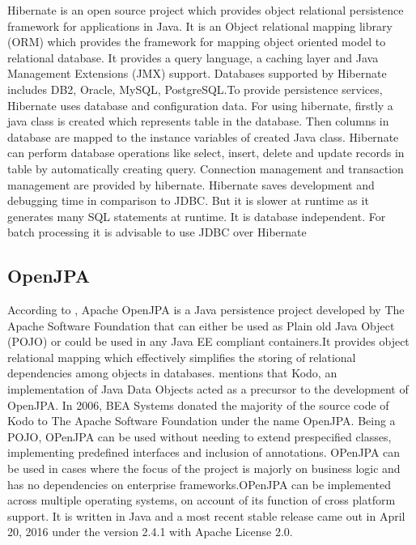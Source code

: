      Hibernate is an open source project which provides object
     relational persistence framework for applications in Java. It is
     an Object relational mapping library (ORM) which provides the
     framework for mapping object oriented model to relational
     database. It provides a query language, a caching layer and Java
     Management Extensions (JMX) support. Databases supported by
     Hibernate includes DB2, Oracle, MySQL, PostgreSQL.To provide
     persistence services, Hibernate uses database and configuration
     data. For using hibernate, firstly a java class is created which
     represents table in the database. Then columns in database are
     mapped to the instance variables of created Java class. Hibernate
     can perform database operations like select, insert, delete and
     update records in table by automatically creating
     query. Connection management and transaction management are
     provided by hibernate.  Hibernate saves development and debugging
     time in comparison to JDBC.  But it is slower at runtime as it
     generates many SQL statements at runtime. It is database
     independent. For batch processing it is advisable to use JDBC
     over Hibernate \cite{www-hibernate}

\subsection{ OpenJPA}

     According to \cite{www-openjpa}, Apache OpenJPA is a Java
     persistence project developed by The Apache Software Foundation that
     can either be used as Plain old Java Object (POJO) or could be used in
     any Java EE compliant containers.It provides object relational mapping
     which effectively simplifies the storing of relational dependencies
     among objects in databases. \cite{www-openjpa-wiki} mentions that
     Kodo, an implementation of Java Data Objects acted as a precursor to
     the development of OpenJPA. In 2006, BEA Systems donated the majority
     of the source code of Kodo to The Apache Software Foundation under the
     name OpenJPA. Being a POJO, OPenJPA can be used without needing to
     extend prespecified classes, implementing predefined interfaces and
     inclusion of annotations. OPenJPA can be used in cases where the focus
     of the project is majorly on business logic and has no dependencies on
     enterprise frameworks.OPenJPA can be implemented across multiple
     operating systems, on account of its function of cross platform
     support. It is written in Java and a most recent stable release came
     out in April 20, 2016 under the version 2.4.1 with Apache License 2.0.

